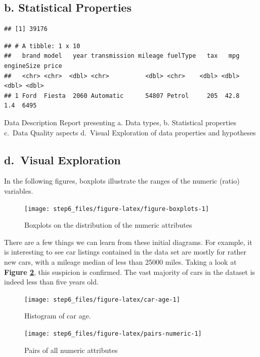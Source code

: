 \documentclass[sigchi]{acmart}
\begin{document}
\hypertarget{b.-statistical-properties}{%
\subsection{b. Statistical Properties}\label{b.-statistical-properties}}

\begin{verbatim}
## [1] 39176
\end{verbatim}

\begin{verbatim}
## # A tibble: 1 x 10
##   brand model   year transmission mileage fuelType   tax   mpg engineSize price
##   <chr> <chr>  <dbl> <chr>          <dbl> <chr>    <dbl> <dbl>      <dbl> <dbl>
## 1 Ford  Fiesta  2060 Automatic      54807 Petrol     205  42.8        1.4  6495
\end{verbatim}

Data Description Report presenting
a. Data types,
b. Statistical properties
c.~Data Quality aspects
d.~Visual Exploration of data properties and hypotheses

\hypertarget{d.-visual-exploration}{%
\subsection{d.~Visual Exploration}\label{d.-visual-exploration}}

In the following figures, boxplots illustrate the ranges of the numeric (ratio) variables.

\begin{figure}
\texttt{[image: step6\_files/figure-latex/figure-boxplots-1]} \caption{Boxplots on the distribution of the numeric attributes}\label{fig:figure-boxplots}
\end{figure}

There are a few things we can learn from these initial diagrams. For example, it is interesting to see car listings contained in the data set are mostly for rather new cars, with a mileage median of less than 25000 miles. Taking a look at \textbf{Figure \ref{fig:car-age}}, this suspicion is confirmed. The vast majority of cars in the dataset is indeed less than five years old.

\begin{figure}
\texttt{[image: step6\_files/figure-latex/car-age-1]} \caption{Histogram of car age.}\label{fig:car-age}
\end{figure}
\begin{figure}
\texttt{[image: step6\_files/figure-latex/pairs-numeric-1]} \caption{Pairs of all numeric attributes}\label{fig:pairs-numeric}
\end{figure}
\end{document}
